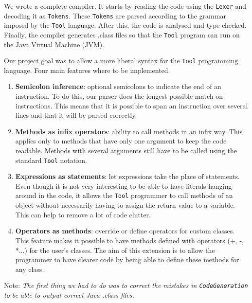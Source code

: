 We wrote a complete compiler. It starts by reading the code using the \lstinline$Lexer$ and decoding it as \lstinline$Tokens$. These \lstinline$Tokens$ are parsed according to the grammar imposed by the \lstinline$Tool$ language. After this, the code is analysed and type checked. Finally, the compiler generates .class files so that the \lstinline$Tool$ program can run on the Java Virtual Machine (JVM).

Our project goal was to allow a more liberal syntax for the \lstinline$Tool$ programming language. Four main features where to be implemented.

\begin{enumerate}
    \item \textbf{Semicolon inference}: optional semicolons to indicate the end of an instruction. To do this, our parser does the longest possible match on instructions. This means that it is possible to span an instruction over several lines and that it will be parsed correctly.
    \item \textbf{Methods as infix operators}: ability to call methods in an infix way. This applies only to methods that have only one argument to keep the code readable. Methods with several arguments still have to be called using the standard \lstinline$Tool$ notation.
    \item \textbf{Expressions as statements}: let expressions take the place of statements. Even though it is not very interesting to be able to have literals hanging around in the code, it allows the \lstinline$Tool$ programmer to call methods of an object without necessarily having to assign the return value to a variable. This can help to remove a lot of code clutter.
    \item \textbf{Operators as methods}: override or define operators for custom classes. This feature makes it possible to have methods defined with operators (+, -, *...) for the user's classes. The aim of this extension is to allow the programmer to have clearer code by being able to define these methods for any class.
\end{enumerate}

Note: \textit{The first thing we had to do was to correct the mistakes in \lstinline$CodeGeneration$ to be able to output correct Java .class files.}